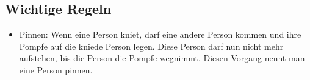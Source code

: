 \documentclass{article}
\begin{document}
\subsection{Wichtige Regeln}
\begin{itemize}
    \item Pinnen: Wenn eine Person kniet, darf eine andere Person kommen und ihre Pompfe auf die kniede Person legen. Diese Person darf nun nicht mehr aufstehen, bis die Person die Pompfe wegnimmt. Diesen Vorgang nennt man eine Person pinnen. \cite{JuggerRegelwerk}
\end{itemize}
\end{document}
